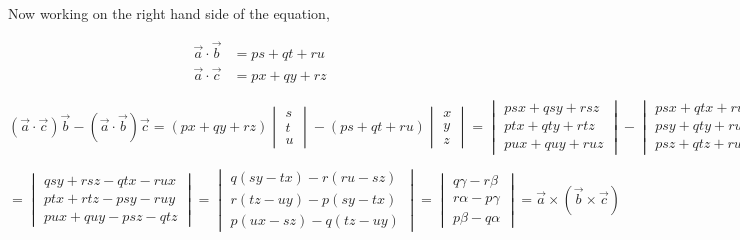Now working on the right hand side of the equation,

\[
\begin{aligned}
    \vec{a}\cdot\vec{b} & = ps + qt + ru \\
    \vec{a}\cdot\vec{c} & = px + qy + rz
\end{aligned}
\]

\[
    (\vec{a}\cdot\vec{c})\vec{b} - (\vec{a}\cdot\vec{b})\vec{c} = (px + qy + rz)\begin{vmatrix}
        s \\
        t \\
        u
    \end{vmatrix} - (ps + qt + ru)\begin{vmatrix}
        x \\
        y \\
        z
    \end{vmatrix} = \begin{vmatrix}
        psx + qsy + rsz \\
        ptx + qty + rtz \\
        pux + quy + ruz
    \end{vmatrix} - \begin{vmatrix}
        psx + qtx + rux \\
        psy + qty + ruy \\
        psz + qtz + ruz
    \end{vmatrix}
\]

\[
    = \begin{vmatrix}      
        qsy + rsz - qtx - rux \\
        ptx + rtz - psy - ruy \\
        pux + quy - psz - qtz
    \end{vmatrix} = \begin{vmatrix}
        q (sy - tx) - r (ru - sz) \\
        r (tz - uy) - p (sy - tx)  \\
        p (ux - sz) - q (tz - uy)
    \end{vmatrix} = \begin{vmatrix}
        q\gamma - r\beta \\
        r\alpha - p\gamma \\
        p\beta - q\alpha
    \end{vmatrix} = \vec{a}\times(\vec{b}\times\vec{c})
\]